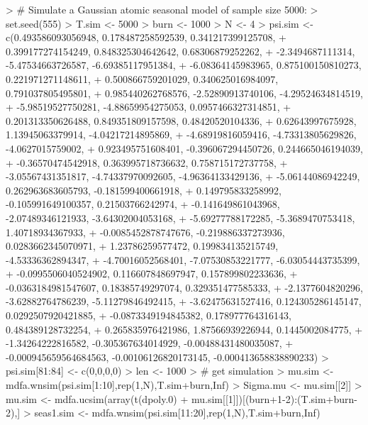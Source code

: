 \documentclass[a4paper]{book}
\begin{document}
\begin{Schunk}
\begin{Sinput}
> # Simulate a Gaussian atomic seasonal model  of sample size 5000:
> set.seed(555)
> T.sim <- 5000
> burn <- 1000
> N <- 4
> psi.sim <- c(0.493586093056948, 0.178487258592539, 0.341217399125708, 
+              0.399177274154249, 0.848325304642642, 0.68306879252262, 
+              -2.3494687111314, -5.47534663726587, -6.69385117951384, 
+              -6.08364145983965, 0.875100150810273, 0.221971271148611, 
+              0.500866759201029, 0.340625016984097, 0.791037805495801, 
+              0.985440262768576, -2.52890913740106, -4.29524634814519, 
+              -5.98519527750281, -4.88659954275053, 0.0957466327314851, 
+              0.201313350626488, 0.849351809157598, 0.48420520104336, 
+              0.62643997675928, 1.13945063379914, -4.04217214895869, 
+              -4.68919816059416, -4.73313805629826, -4.0627015759002,
+              0.923495751608401, -0.396067294450726, 0.244665046194039, 
+              -0.36570474542918, 0.363995718736632, 0.758715172737758, 
+              -3.05567431351817, -4.74337970092605, -4.96364133429136, 
+              -5.06144086942249, 0.262963683605793, -0.181599400661918, 
+              0.149795833258992, -0.105991649100357, 0.21503766242974, 
+              -0.141649861043968, -2.07489346121933, -3.64302004053168, 
+              -5.69277788172285, -5.3689470753418, 1.40718934367933,
+              -0.0085452878747676, -0.219886337273936, 0.0283662345070971,
+              1.23786259577472, 0.199834135215749, -4.53336362894347, 
+              -4.70016052568401, -7.07530853221777, -6.03054443735399, 
+              -0.0995506040524902, 0.116607848697947, 0.157899802233636, 
+              -0.0363184981547607, 0.18385749297074, 0.329351477585333, 
+              -2.1377604820296, -3.62882764786239, -5.11279846492415, 
+              -3.62475631527416, 0.124305286145147, 0.0292507920421885, 
+              -0.0873349194845382, 0.178977764316143, 0.484389128732254,
+              0.265835976421986, 1.87566939226944, 0.1445002084775, 
+              -1.34264222816582, -0.305367634014929, -0.00488431480035087, 
+              -0.000945659564684563, -0.00106126820173145, -0.000413658838890233)
> psi.sim[81:84] <- c(0,0,0,0)
> len <- 1000
> # get simulation
> mu.sim <- mdfa.wnsim(psi.sim[1:10],rep(1,N),T.sim+burn,Inf)
> Sigma.mu <- mu.sim[[2]]
> mu.sim <- mdfa.ucsim(array(t(dpoly.0) %
+                      mu.sim[[1]])[(burn+1-2):(T.sim+burn-2),]
> seas1.sim <- mdfa.wnsim(psi.sim[11:20],rep(1,N),T.sim+burn,Inf)

\end{Sinput}
\end{Schunk}
\end{document}
